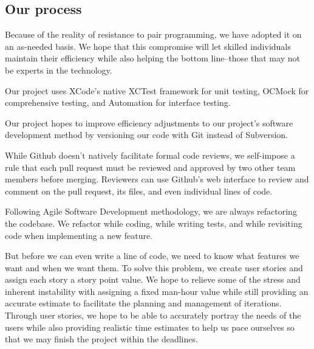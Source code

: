 \subsection{Our process}
Because of the reality of resistance to pair programming, we have adopted it on an as-needed basis. We hope that this compromise will let skilled individuals maintain their efficiency while also helping the bottom line–those that may not be experts in the technology.

Our project uses XCode's native XCTest framework for unit testing, OCMock for comprehensive testing, and Automation for interface testing.

Our project hopes to improve efficiency adjustments to our project’s software development method by versioning our code with Git instead of Subversion.

While Github doesn’t natively facilitate formal code reviews, we self-impose a rule that each pull request must be reviewed and approved by two other team members before merging. Reviewers can use Github’s web interface to review and comment on the pull request, its files, and even individual lines of code. 

Following Agile Software Development methodology, we are always refactoring the codebase. We refactor while coding, while writing tests, and while revisiting code when implementing a new feature.

But before we can even write a line of code, we need to know what features we want and when we want them. To solve this problem, we create user stories and assign each story a story point value. We hope to relieve some of the stress and inherent instability with assigning a fixed man-hour value while still providing an accurate estimate to facilitate the planning and management of iterations. Through user stories, we hope to be able to accurately portray the needs of the users while also providing realistic time estimates to help us pace ourselves so that we may finish the project within the deadlines.